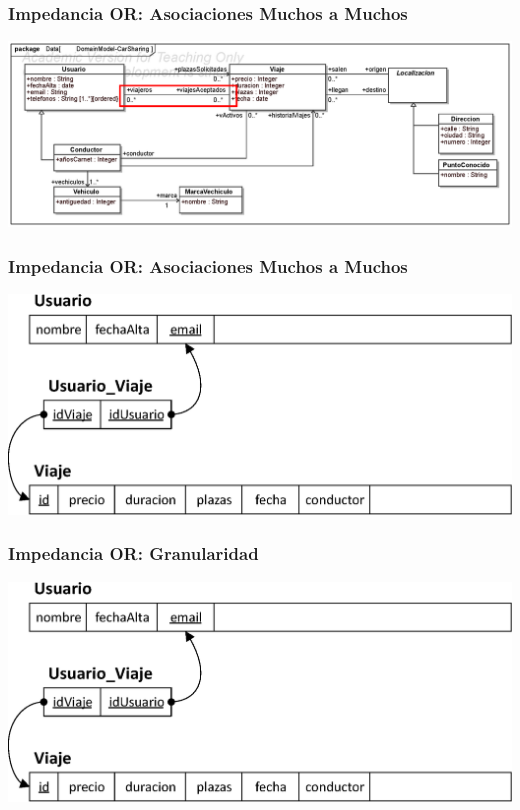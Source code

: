 \documentclass[a4paper,slidestop,xcolor=pst,dvips,blue]{beamer}
\begin{document}
\begin{frame}[c]
    \frametitle{Impedancia OR: Asociaciones Muchos a Muchos}
    \begin{center}
        \includegraphics[width=\linewidth]{images/persistencia/ooMismatch/ooMismatch07.eps}
    \end{center}
\end{frame}

\begin{frame}[c]
    \frametitle{Impedancia OR: Asociaciones Muchos a Muchos}
    \begin{center}
        \includegraphics[width=0.8\linewidth]{images/persistencia/ooMismatch/ooMismatch08.eps}
    \end{center}
\end{frame}

\begin{frame}[c]
    \frametitle{Impedancia OR: Granularidad}
    \begin{center}
        \includegraphics[width=0.8\linewidth]{images/persistencia/ooMismatch/ooMismatch08.eps}
    \end{center}
\end{frame}
\end{document}
